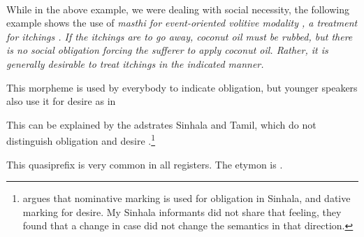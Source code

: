  \\ 


While in the above example, we were dealing with social necessity, the following example shows the use of \em masthi \em for event-oriented volitive modality ,  a treatment for itchings . If the itchings are to go away, coconut oil must be rubbed, but there is no social obligation forcing the sufferer to apply coconut oil. Rather, it is generally desirable to treat itchings in the indicated manner.




This morpheme is used by everybody to indicate obligation, but younger speakers also use it for desire as in 



This can be explained by the adstrates Sinhala and Tamil, which do not distinguish obligation and desire \citep[84]{Lehmann1989}.\footnote{\citet[12]{Karunatillake2004} argues that nominative marking is used for obligation in Sinhala, and dative marking for desire. My Sinhala informants did not share that feeling, they found that a change in case did not change the semantics in that direction.}

This quasiprefix is very common in all registers.
The etymon  is  \citep{SmithEtAl2004,SmithEtAl2006cll}.

